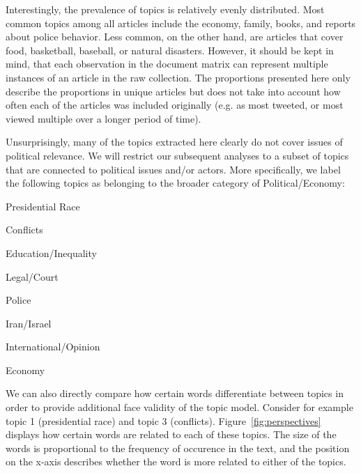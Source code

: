 \documentclass[12pt]{article}
\begin{document}
\begin{doublespace}
Interestingly, the prevalence of topics is relatively evenly distributed. Most common topics among all articles include the economy, family, books, and reports about police behavior. Less common, on the other hand, are articles that cover food, basketball, baseball, or natural disasters. However, it should be kept in mind, that each observation in the document matrix can represent multiple instances of an article in the raw collection. The proportions presented here only describe the proportions in unique articles but does not take into account how often each of the articles was included originally (e.g. as most tweeted, or most viewed multiple over a longer period of time).

Unsurprisingly, many of the topics extracted here clearly do not cover issues of political relevance. We will restrict our subsequent analyses to a subset of topics that are connected to political issues and/or actors. More specifically, we label the following topics as belonging to the broader category of Political/Economy:

\begin{enumerate}[(a)]\singlespacing
\begin{multicols}{2}
\item Presidential Race \item Conflicts \item Education/Inequality \item Legal/Court 
\columnbreak
\item Police \item Iran/Israel \item International/Opinion \item Economy
\end{multicols}
\end{enumerate}

We can also directly compare how certain words differentiate between topics in order to provide additional face validity of the topic model. Consider for example topic 1 (presidential race) and topic 3 (conflicts). Figure~\ref{fig:perspectives} displays how certain words are related to each of these topics. The size of the words is proportional to the frequency of occurence in the text, and the position on the x-axis describes whether the word is more related to either of the topics.


\end{doublespace}
\end{document}

